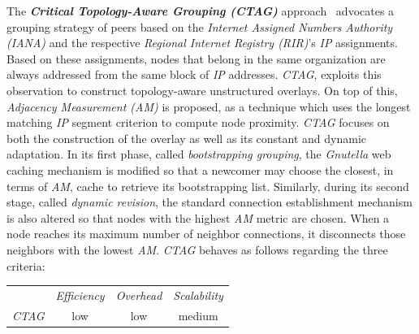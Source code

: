 The \textbf{\emph{Critical Topology-Aware Grouping (CTAG)}} approach~\cite{ZL2006}
advocates a grouping strategy of peers based on the 
\emph{Internet Assigned Numbers Authority (IANA)} and 
the respective \emph{Regional Internet Registry (RIR)}'s \emph{IP} assignments.
Based on these assignments, nodes that belong in the same 
organization are always addressed from the same block of \emph{IP} addresses.
\emph{CTAG}, exploits this observation to construct topology-aware unstructured
overlays. On top of this, \emph{Adjacency Measurement (AM)} is proposed, as
a technique which uses the longest matching \emph{IP} segment criterion to
compute node proximity. \emph{CTAG} focuses on both the construction of the
overlay as well as its constant and dynamic adaptation.
In its first phase, called \emph{bootstrapping grouping},
the \emph{Gnutella} web caching mechanism
is modified so that a newcomer may choose the closest, in terms of \emph{AM},
cache to retrieve its bootstrapping list. 
Similarly, during its second stage,
called \emph{dynamic revision}, the standard connection establishment mechanism
is also altered so that nodes with the highest \emph{AM} metric are chosen. 
When a node reaches its maximum number of neighbor
connections, it disconnects those neighbors with the lowest \emph{AM}.
\emph{CTAG} behaves as follows regarding the three criteria:
\begin{center}
{\footnotesize
\begin{tabular}{rccc}
\multicolumn{1}{r}{} &
\multicolumn{1}{c}{\emph{Efficiency}} &
\multicolumn{1}{c}{\emph{Overhead}} &
\multicolumn{1}{c}{\emph{Scalability}}
\\
\cline{2-4}
\emph{CTAG} &
low &
low &
medium
\end{tabular}
}
\end{center}



